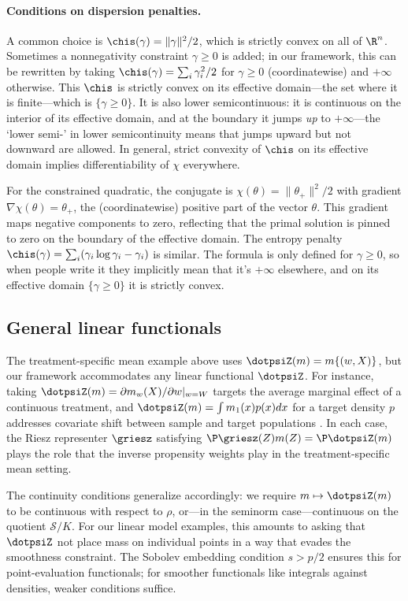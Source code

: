 \documentclass{article}
\newcommand{\calS}{\mathcal{S}}
\begin{document}
\paragraph{Conditions on dispersion penalties.}
A common choice is $\chis(\gamma) = \|\gamma\|^2/2$, which is strictly convex on all of $\R^n$. Sometimes a nonnegativity constraint $\gamma \ge 0$ is added; in our framework, this can be rewritten by taking $\chis(\gamma) = \sum_i \gamma_i^2/2$ for  $\gamma \ge 0$ (coordinatewise) and $+\infty$ otherwise. This $\chis$ is strictly convex on its effective domain---the set where it is finite---which is $\{ \gamma \ge 0\}$. It is also lower semicontinuous: it is continuous on the interior of its effective domain, and at the boundary it jumps \emph{up} to $+\infty$---the `lower semi-' in lower semicontinuity means that jumps upward but not downward are allowed.
In general, strict convexity of $\chis$ on its effective domain implies differentiability of $\chi$ everywhere.

For the constrained quadratic, the conjugate is $\chi(\theta) = \|\theta_+\|^2/2$ with gradient $\nabla \chi(\theta)= \theta_+$, the (coordinatewise) positive part of the vector $\theta$. This gradient maps negative components to zero, reflecting that the primal solution is pinned to zero on the boundary of the effective domain. The entropy penalty $\chis(\gamma) = \sum_i (\gamma_i \log \gamma_i - \gamma_i)$ is similar. The formula is only defined for $\gamma \ge 0$, so when people write it they implicitly mean that it's $+\infty$ elsewhere, and on its effective domain $\{ \gamma \ge 0\}$ it is strictly convex.

\subsection{General linear functionals}
The treatment-specific mean example above uses $\dotpsiZ(m) = m\{(w, X)\}$, but our framework accommodates any linear functional $\dotpsiZ$. For instance, taking $\dotpsiZ(m) = \partial m_w(X)/\partial w |_{w=W}$ targets the average marginal effect of a continuous treatment, and $\dotpsiZ(m) = \int m_1(x) p(x) dx$ for a target density $p$ addresses covariate shift between sample and target populations \citep{hirshberg2018augmented}. In each case, the Riesz representer $\griesz$ satisfying $\P \griesz(Z) m(Z) = \P \dotpsiZ(m)$ plays the role that the inverse propensity weights play in the treatment-specific mean setting.

The continuity conditions generalize accordingly: we require $m \mapsto \dotpsiZ(m)$ to be continuous with respect to $\rho$, or---in the seminorm case---continuous on the quotient $\calS / K$. For our linear model examples, this amounts to asking that $\dotpsiZ$ not place mass on individual points in a way that evades the smoothness constraint. The Sobolev embedding condition $s > p/2$ ensures this for point-evaluation functionals; for smoother functionals like integrals against densities, weaker conditions suffice.
\end{document}
